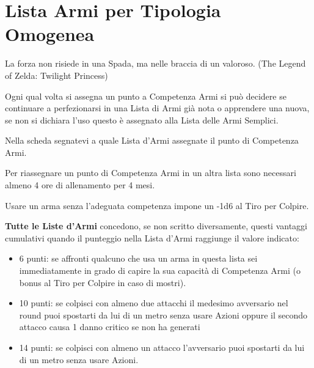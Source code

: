 \section{Lista Armi per Tipologia Omogenea}\hypertarget{lista.armi}{}\label{lista.armi}

\begin{changemargin}{0.3cm}{0.3cm}\begin{enfasi}{La forza non risiede in una Spada, ma nelle braccia di un valoroso. (The Legend of Zelda: Twilight Princess)} \end{enfasi}\end{changemargin}\medskip

\begin{multicols}{2}

Ogni qual volta si assegna un punto a Competenza Armi si può decidere se continuare a perfezionarsi in una Lista di Armi già nota o apprendere una nuova, se non si dichiara l'uso questo è assegnato alla Lista delle Armi Semplici.

Nella scheda segnatevi a quale Lista d'Armi assegnate il punto di Competenza Armi.

Per riassegnare un punto di Competenza Armi in un altra lista sono necessari almeno 4 ore di allenamento per 4 mesi.

Usare un arma senza l'adeguata competenza impone un -1d6 al Tiro per Colpire.

\textbf{Tutte le Liste d'Armi} concedono, se non scritto diversamente, questi vantaggi cumulativi quando il punteggio nella Lista d'Armi raggiunge il valore indicato:

\begin{itemize}[leftmargin=*] \setlength{\itemsep}{0pt}

\item 6 punti: se affronti qualcuno che usa un arma in questa lista sei immediatamente in grado di capire la sua capacità di Competenza Armi (o bonus al Tiro per Colpire in caso di mostri).

\item 10 punti: se colpisci con almeno due attacchi il medesimo avversario nel round puoi spostarti da lui di un metro senza usare Azioni oppure il secondo attacco causa 1 danno critico se non ha generati

\item 14 punti: se colpisci con almeno un attacco l'avversario puoi spostarti da lui di un metro senza usare Azioni.


\end{itemize}
\end{multicols}
